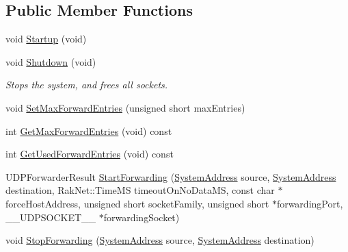 \subsection*{Public Member Functions}
\begin{DoxyCompactItemize}
\item 
void \hyperlink{class_rak_net_1_1_u_d_p_forwarder_a33db580779b6bc0c52e82c18c9f82e0e}{Startup} (void)
\item 
\hypertarget{class_rak_net_1_1_u_d_p_forwarder_a601f4783a6c32353a99c26d0996f0500}{void \hyperlink{class_rak_net_1_1_u_d_p_forwarder_a601f4783a6c32353a99c26d0996f0500}{Shutdown} (void)}\label{class_rak_net_1_1_u_d_p_forwarder_a601f4783a6c32353a99c26d0996f0500}

\begin{DoxyCompactList}\small\item\em Stops the system, and frees all sockets. \end{DoxyCompactList}\item 
void \hyperlink{class_rak_net_1_1_u_d_p_forwarder_a59d01c307683affb6ecf8c6a2e18d7ca}{Set\-Max\-Forward\-Entries} (unsigned short max\-Entries)
\item 
int \hyperlink{class_rak_net_1_1_u_d_p_forwarder_a48432aa3792333a7372748b10e085b03}{Get\-Max\-Forward\-Entries} (void) const 
\item 
int \hyperlink{class_rak_net_1_1_u_d_p_forwarder_a905a55dfed3c5580971c1324cf014fbf}{Get\-Used\-Forward\-Entries} (void) const 
\item 
U\-D\-P\-Forwarder\-Result \hyperlink{class_rak_net_1_1_u_d_p_forwarder_ab7f8cd50c56845a8822c3ba0fbf3ab92}{Start\-Forwarding} (\hyperlink{struct_rak_net_1_1_system_address}{System\-Address} source, \hyperlink{struct_rak_net_1_1_system_address}{System\-Address} destination, Rak\-Net\-::\-Time\-M\-S timeout\-On\-No\-Data\-M\-S, const char $\ast$force\-Host\-Address, unsigned short socket\-Family, unsigned short $\ast$forwarding\-Port, \-\_\-\-\_\-\-U\-D\-P\-S\-O\-C\-K\-E\-T\-\_\-\-\_\- $\ast$forwarding\-Socket)
\item 
void \hyperlink{class_rak_net_1_1_u_d_p_forwarder_a4611e9e3408e73980c5978e972a2dbd8}{Stop\-Forwarding} (\hyperlink{struct_rak_net_1_1_system_address}{System\-Address} source, \hyperlink{struct_rak_net_1_1_system_address}{System\-Address} destination)
\end{DoxyCompactItemize}
